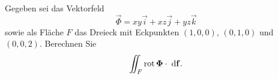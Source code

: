 \begin{atiTask}[
  title = Oberflächenintegral
]

Gegeben sei das Vektorfeld 
\[
\vec{\Phi}=xy\vec{i}+xz\vec{j}+yz\vec{k}
\]
sowie als Fläche $F$ das Dreieck mit Eckpunkten $(1,0,0)$, $(0,1,0)$ und $(0,0,2)$. Berechnen Sie 
\[
\iint_F \operatorname{rot} \mathbf{\Phi}\cdot \;\mathrm{d}\mathbf{f}.
\]


\end{atiTask}

\begin{atiSolution}
	
\end{atiSolution}
